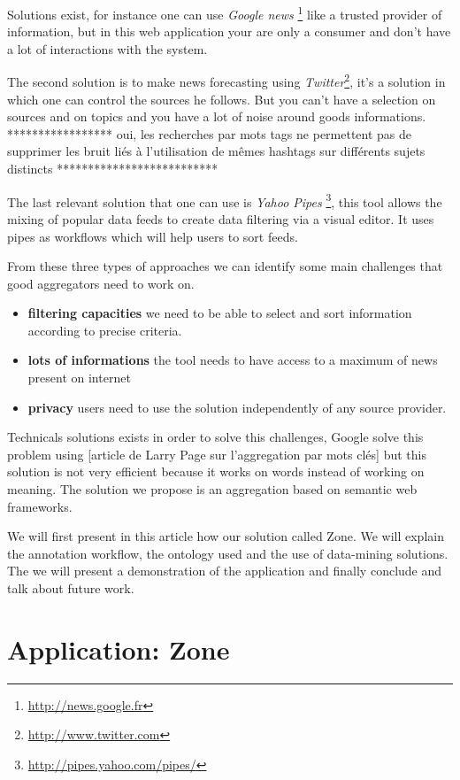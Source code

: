 \documentclass{llncs}
\begin{document}
Solutions exist, for instance one can use \textsl{Google news} \footnote{\url{http://news.google.fr}} like a trusted provider of information, but in this web application your are only a consumer and don't have a lot of interactions with the system. 

The second solution is to make news forecasting using \textsl{Twitter}\footnote{\url{http://www.twitter.com}}, it's a  solution in which one can control the sources he follows. But you can't have a selection on sources and on topics and you have a lot of noise around goods informations.
***************** oui, les recherches par mots tags ne permettent pas de supprimer les bruit liés à l'utilisation de mêmes hashtags sur différents sujets distincts **************************


The last relevant solution that one can use is \textsl{Yahoo Pipes} \footnote{\url{http://pipes.yahoo.com/pipes/}}, this tool allows the mixing of popular data feeds to create data filtering via a visual editor. It uses pipes as workflows which will help users to sort feeds.

From these three types of approaches we can identify some main challenges that good aggregators need to work on.
\begin{itemize}
  \item \textbf{filtering capacities} we need to be able to select and sort information according to precise criteria.
  \item \textbf{lots of informations} the tool needs to have access to a maximum of news present on internet 
  \item \textbf{privacy} users need to use the solution independently of any source provider.
\end{itemize}

Technicals solutions exists in order to solve this challenges, Google solve this problem using [article de Larry Page sur l'aggregation par mots clés] but this solution is not very efficient because it works on words instead of working on meaning. The solution we propose is an aggregation based on semantic web frameworks. 

We will first present in this article how our solution called Zone. We will explain the annotation workflow, the ontology used and the use of data-mining solutions. The we will present a demonstration of the application and finally conclude and talk about future work.

%
\section{Application: Zone}
\end{document}
